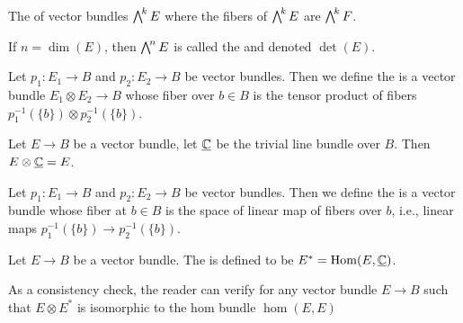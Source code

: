 \begin{definition}
The  of vector bundles $\extp^{k}E$ where the fibers of
$\extp^{k}E$ are $\extp^{k}F$.
\end{definition}

\begin{definition}
If $n=\dim(E)$, then $\extp^{n}E$ is called the 
and denoted $\det(E)$.
\end{definition}

\begin{definition}
Let $p_{1}\colon E_{1}\to B$ and $p_{2}\colon E_{2}\to B$ be vector bundles. Then
we define the  is a vector bundle $E_{1}\otimes E_{2}\to B$
whose fiber over $b\in B$ is the tensor product of fibers
$p_{1}^{-1}(\{b\})\otimes p_{2}^{-1}(\{b\})$.
\end{definition}

\begin{example}
Let $E\to B$ be a vector bundle, let $\underline{\mathbb{C}}$ be the
trivial line bundle over $B$. Then $E\otimes\underline{\mathbb{C}}=E$.
\end{example}

\begin{definition}
Let $p_{1}\colon E_{1}\to B$ and $p_{2}\colon E_{2}\to B$ be vector bundles. Then
we define the  is a vector bundle whose fiber at
$b\in B$ is the space of linear map of fibers over $b$, i.e., linear maps $p_{1}^{-1}(\{b\})\to p_{2}^{-1}(\{b\})$.
\end{definition}

\begin{definition}
Let $E\to B$ be a vector bundle. The  is defined
to be $E^{*}=\operatorname{Hom}(E,\underline{\mathbb{C}})$.
\end{definition}

\begin{example}
As a consistency check, the reader can verify for any vector bundle
$E\to B$ such that $E\otimes E^{*}$ is isomorphic to the hom bundle $\hom(E,E)$
\end{example}

